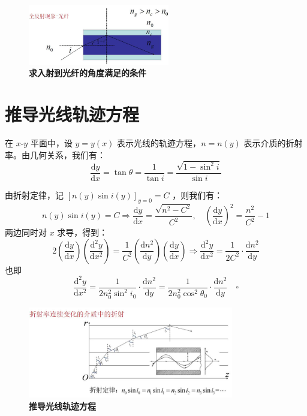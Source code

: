 \documentclass[UTF8]{report}
\theoremstyle{MyLineTheoremStyle} %
\theoremstyle{MyBlockTheoremStyle} %
\theoremstyle{MySubsubsectionStyle} %
\begin{document}
\begin{figure}[H]\centering
\includegraphics[width=0.55\textwidth]{assets/1/c6c9e6ef2f6755ead534508010ad0452 (2).jpg}
\caption{\textbf{求入射到光纤的角度满足的条件}}\label{求入射到光纤的角度满足的条件}
\end{figure}

\section{推导光线轨迹方程}

在 $x$-$y$ 平面中，设 $y = y(x)$ 表示光线的轨迹方程，$n = n(y)$ 表示介质的折射率。由几何关系，我们有：
\begin{equation}
\frac{\mathrm{d} y }{\mathrm{d} x } = \tan \theta = \frac{1}{\tan i} = \frac{\sqrt{1-\sin^2 i}}{\sin i} 
\end{equation}

由折射定律，记 $[n(y)\sin i(y)]_{y=0} = C$ ，则我们有：
\begin{equation}
n(y)\sin i(y) = C  \Longrightarrow \frac{\mathrm{d} y }{\mathrm{d} x } = \frac{\sqrt{n^2 - C^2}}{C^2}, \quad \left(\frac{\mathrm{d} y }{\mathrm{d} x }\right)^{2} = \frac{n^2}{C^2} - 1
\end{equation}
两边同时对 $x$ 求导，得到：
\begin{equation}
2 \left(\frac{\mathrm{d} y }{\mathrm{d} x }\right) \left(\frac{\mathrm{d}^2 y }{\mathrm{d} x^2 }\right) = \frac{1}{C^2} \left(\frac{\mathrm{d} n^2 }{\mathrm{d} y }\right) \left(\frac{\mathrm{d} y }{\mathrm{d} x }\right) \Longrightarrow \frac{\mathrm{d}^2 y }{\mathrm{d} x^2 } = \frac{1}{2C^2}\cdot \frac{\mathrm{d} n^2 }{\mathrm{d} y } 
\end{equation}
也即
\begin{equation}
    \frac{\mathrm{d}^2 y }{\mathrm{d} x^2 } = \frac{1}{2n_0^2\sin^2 i_0}\cdot \frac{\mathrm{d} n^2 }{\mathrm{d} y } = \frac{1}{2n_0^2\cos^2 \theta_0}\cdot \frac{\mathrm{d} n^2 }{\mathrm{d} y } \quad \square
\end{equation}

\begin{figure}[H]\centering
\includegraphics[width=0.8\textwidth]{assets/1/88b3f41951f9d3be9e2964935ebaf0f7.jpg}
\caption{\textbf{推导光线轨迹方程}}\label{推导光线轨迹方程}
\end{figure}
\end{document}
